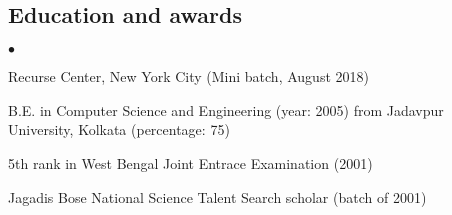 \documentclass[margin,line]{res}
\newenvironment{list1}{
  \begin{list}{$\bullet$}{%
      \setlength{\itemsep}{0in}
      \setlength{\parsep}{0in} \setlength{\parskip}{0in}
      \setlength{\topsep}{0in} \setlength{\partopsep}{0in}
      \setlength{\leftmargin}{0.17in}}}{\end{list}}
\begin{document}
\begin{resume}
\section{\sc Education and awards}
\begin{list1}
	\item Recurse Center, New York City (Mini batch, August 2018)
	\item B.E. in Computer Science and Engineering (year: 2005)
from Jadavpur University, Kolkata (percentage: 75)
	\item 5th rank in West Bengal Joint Entrace Examination (2001)
	\item Jagadis Bose National Science Talent Search scholar (batch of 2001)
\end{list1}

\end{resume}
\end{document}
